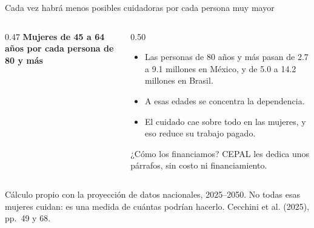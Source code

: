 \documentclass[aspectratio=169,11pt]{beamer}
\newcommand{\fuente}[1]{\par\vfill{\small\color{cGris}#1\par}}
\begin{document}
\begin{frame}{Cada vez habrá menos posibles cuidadoras por cada persona muy mayor}
  \begin{columns}[T]
    \begin{column}{0.47\textwidth}
      \textbf{Mujeres de 45 a 64 años por cada persona de 80 y más}\par\medskip
      \centering
    \end{column}
    \begin{column}{0.50\textwidth}
      \begin{itemize}
        \item Las personas de 80 años y más pasan de 2.7 a 9.1 millones en México, y de 5.0 a 14.2 millones en Brasil.
        \item A esas edades se concentra la dependencia.
        \item El cuidado cae sobre todo en las mujeres, y eso reduce su trabajo pagado.
      \end{itemize}
      \pause
      \begin{alertblock}{¿Cómo los financiamos?}
        CEPAL les dedica unos párrafos, sin costo ni financiamiento.
      \end{alertblock}
    \end{column}
  \end{columns}
  \fuente{Cálculo propio con la proyección de datos nacionales, 2025--2050. No todas esas mujeres cuidan: es una medida de cuántas podrían hacerlo. Cecchini et al. (2025), pp.~49 y 68.}
\end{frame}
\end{document}
